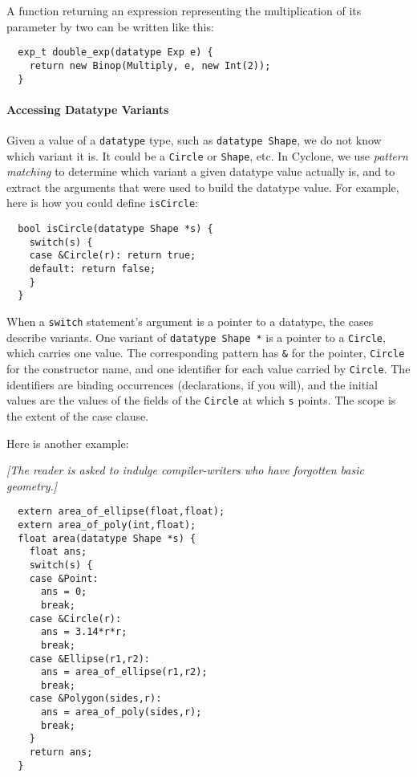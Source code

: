 A function returning an expression representing the multiplication of
its parameter by two can be written like this:
\begin{verbatim}
  exp_t double_exp(datatype Exp e) {
    return new Binop(Multiply, e, new Int(2));
  }
\end{verbatim}

\paragraph{Accessing Datatype Variants} Given a value of a \texttt{datatype}
type, such as \texttt{datatype Shape}, we do not know which variant it is.
It could be a \texttt{Circle} or \texttt{Shape}, etc.  In Cyclone, we
use \emph{pattern matching} to determine which variant a given datatype
value actually is, and to extract the arguments that were used to
build the datatype value.  For example, here is how you could define
\texttt{isCircle}:
\begin{verbatim}
  bool isCircle(datatype Shape *s) {
    switch(s) {
    case &Circle(r): return true;
    default: return false;
    }
  }
\end{verbatim}

When a \texttt{switch} statement's argument is a pointer to a datatype,
the cases describe variants.  One variant of \texttt{datatype Shape *} is a
pointer to a \texttt{Circle}, which carries one value.  The
corresponding pattern has \texttt{\&} for the pointer, \texttt{Circle} for
the constructor name, and one identifier for each value carried by
\texttt{Circle}.  The identifiers are binding occurrences (declarations,
if you will), and the initial values are the values of the fields of
the \texttt{Circle} at which \texttt{s} points.  The scope is the extent
of the case clause.  

Here is another example:

\textit{[The reader is asked to indulge compiler-writers who have
  forgotten basic geometry.]}
\begin{verbatim}
  extern area_of_ellipse(float,float);
  extern area_of_poly(int,float);
  float area(datatype Shape *s) {
    float ans;
    switch(s) {
    case &Point:
      ans = 0;
      break;
    case &Circle(r):
      ans = 3.14*r*r;
      break;
    case &Ellipse(r1,r2):
      ans = area_of_ellipse(r1,r2);
      break;
    case &Polygon(sides,r):
      ans = area_of_poly(sides,r);
      break;
    }
    return ans;
  }
\end{verbatim}

